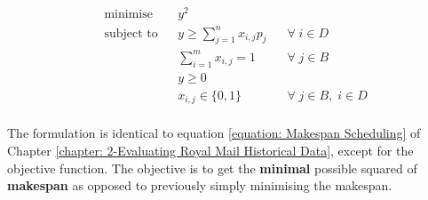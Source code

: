 
\vspace{\baselineskip}
\begin{equation}
\label{equation: Makespan Squared Scheduling}
\begin{aligned}
&\text{minimise}
& & y^2  \\ 
& \text{subject to}
& & y \geq \sum _{j=1}^n x_{i,j}p_{j}  \;\;\; &\forall \; i \in D\\   
& & &\sum _{i=1}^m x_{i,j} = 1 \;\;\; &\forall \; j \in B\\
& & & y\geq 0  \\
& & & x_{i,j} \in  \{ 0,1 \} \;\;\; &\forall \; j \in B, \; i \in D\\
\end{aligned}
\end{equation}

\vspace{\baselineskip}
\noindent
The formulation is identical to equation \ref{equation: Makespan Scheduling} of Chapter \ref{chapter: 2-Evaluating Royal Mail Historical Data}, except for the objective function. The objective is to get the \textbf{minimal} possible squared of \textbf{makespan} as opposed to previously simply minimising the makespan.

